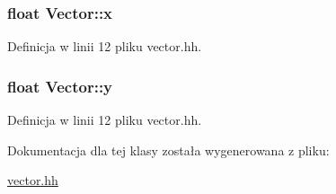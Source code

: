\subsubsection[{x}]{\setlength{\rightskip}{0pt plus 5cm}float Vector\+::x\hspace{0.3cm}{\ttfamily [private]}}\label{class_vector_aca49165049a1e21ae47afcfc078819ed}


Definicja w linii 12 pliku vector.\+hh.

\hypertarget{class_vector_a81be9102fca6d9beea3efef522c4c09d}{}
\subsubsection[{y}]{\setlength{\rightskip}{0pt plus 5cm}float Vector\+::y\hspace{0.3cm}{\ttfamily [private]}}\label{class_vector_a81be9102fca6d9beea3efef522c4c09d}


Definicja w linii 12 pliku vector.\+hh.



Dokumentacja dla tej klasy została wygenerowana z pliku\+:\begin{DoxyCompactItemize}
\item 
\hyperlink{vector_8hh}{vector.\+hh}\end{DoxyCompactItemize}
